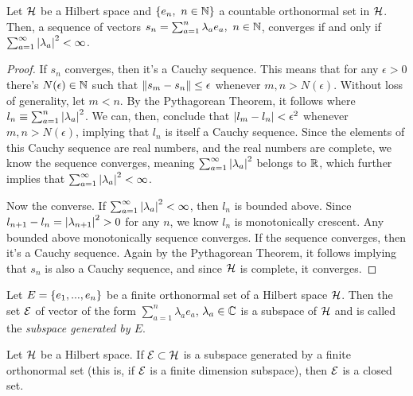 \documentclass[oneside, 10pt, notitlepage]{book}
\begin{document}
\begin{proposition}
	Let \(\mathcal{H}\) be a Hilbert space and \(\left\{e_n,\ n\in \mathbb{N}\right\}\) a countable orthonormal set in \(\mathcal{H}\). Then, a sequence of vectors \(s_n = \sum_{a=1}^n \lambda_a e_a,\ n \in \mathbb{N}\), converges if and only if \(\sum_{a=1}^{\infty} \abs{\lambda_a}^2 < \infty\).
\end{proposition}
\begin{proof}
	If \(s_n\) converges, then it's a Cauchy sequence. This means that for any \(\epsilon>0\) there's \(N(\epsilon)\in \mathbb{N}\) such that \(\norm{s_m - s_n}\leq \epsilon\) whenever \(m,n > N(\epsilon)\). Without loss of generality, let \(m<n\). By the Pythagorean Theorem, it follows
	where \(l_n \equiv \sum_{a=1}^n \abs{\lambda_a}^2\). We can, then, conclude that \(\abs{l_m - l_n}< \epsilon^2\) whenever \(m,n > N(\epsilon)\), implying that \(l_n\) is itself a Cauchy sequence. Since the elements of this Cauchy sequence are real numbers, and the real numbers are complete, we know the sequence converges, meaning \(\sum_{a=1}^{\infty} \abs{\lambda_a}^2\) belongs to \(\mathbb{R}\), which further implies that \(\sum_{a=1}^{\infty} \abs{\lambda_a}^2<\infty\).\par
	Now the converse. If \(\sum_{a=1}^{\infty} \abs{\lambda_a}^2<\infty\), then \(l_n\) is bounded above. Since \(l_{n+1}-l_n = \abs{\lambda_{n+1}}^2 > 0\) for any \(n\), we know \(l_n\) is monotonically crescent. Any bounded above monotonically sequence converges. If the sequence converges, then it's a Cauchy sequence. Again by the Pythagorean Theorem, it follows
	implying that \(s_n\) is also a Cauchy sequence, and since \(\mathcal{H}\) is complete, it converges.
\end{proof}


\begin{corollary}
	Let \(E=\left\{e_1,...,e_n\right\}\) be a finite orthonormal set of a Hilbert space \(\mathcal{H}\). Then the set \(\mathcal{E}\) of vector of the form \(\sum_{a=1}^n \lambda_a e_a\), \(\lambda_a \in \mathbb{C}\) is a subspace of \(\mathcal{H}\) and is called the \emph{subspace generated by \(E\)}.
\end{corollary}

\begin{proposition}
	Let \(\mathcal{H}\) be a Hilbert space. If \(\mathcal{E}\subset \mathcal{H}\) is a subspace generated by a finite orthonormal set (this is, if \(\mathcal{E}\) is a finite dimension subspace), then \(\mathcal{E}\) is a closed set.
\end{proposition}
\end{document}
